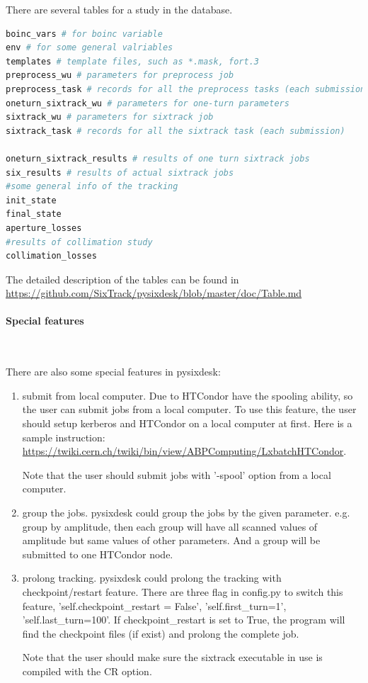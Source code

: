 There are several tables for a study in the database. 
\begin{lstlisting}[language=Python]
boinc_vars # for boinc variable
env # for some general valriables 
templates # template files, such as *.mask, fort.3
preprocess_wu # parameters for preprocess job
preprocess_task # records for all the preprocess tasks (each submission)
oneturn_sixtrack_wu # parameters for one-turn parameters
sixtrack_wu # parameters for sixtrack job
sixtrack_task # records for all the sixtrack task (each submission)

oneturn_sixtrack_results # results of one turn sixtrack jobs
six_results # results of actual sixtrack jobs
#some general info of the tracking
init_state
final_state
aperture_losses
#results of collimation study
collimation_losses
\end{lstlisting}
The detailed description of the tables can be found in \url{https://github.com/SixTrack/pysixdesk/blob/master/doc/Table.md}

\paragraph{Special features}~

There are also some special features in pysixdesk:
\begin{enumerate}
\item submit from local computer. Due to HTCondor have the spooling ability, so the user can submit jobs from a local computer. To use this feature, the user should setup kerberos and HTCondor on a local computer at first. Here is a sample instruction:
\url{https://twiki.cern.ch/twiki/bin/view/ABPComputing/LxbatchHTCondor}. 

Note that the user should submit jobs with '-spool' option from a local computer.

\item group the jobs. pysixdesk could group the jobs by the given parameter. e.g. group by amplitude, then each group will have all scanned values of amplitude but same values of other parameters. And a group will be submitted to one HTCondor node.

\item prolong tracking. pysixdesk could prolong the tracking with checkpoint/restart feature. There are three flag in config.py to switch this feature, 'self.checkpoint\_restart = False', 'self.first\_turn=1', 'self.last\_turn=100'. If checkpoint\_restart is set to True, the program will find the checkpoint files (if exist) and prolong the complete job. 

Note that the user should make sure the sixtrack executable in use is compiled with the CR option.
\end{enumerate}

